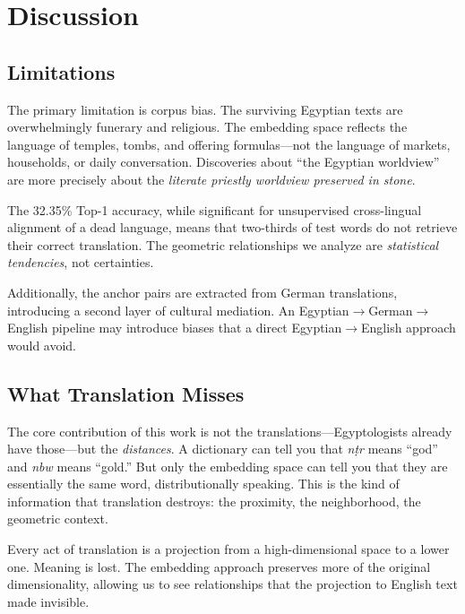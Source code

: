 \documentclass[11pt, a4paper]{article}
\begin{document}
\section{Discussion}
\label{sec:discussion}

\subsection{Limitations}

The primary limitation is corpus bias. The surviving Egyptian texts are overwhelmingly funerary and religious. The embedding space reflects the language of temples, tombs, and offering formulas---not the language of markets, households, or daily conversation. Discoveries about ``the Egyptian worldview'' are more precisely about the \textit{literate priestly worldview preserved in stone}.

The 32.35\% Top-1 accuracy, while significant for unsupervised cross-lingual alignment of a dead language, means that two-thirds of test words do not retrieve their correct translation. The geometric relationships we analyze are \textit{statistical tendencies}, not certainties.

Additionally, the anchor pairs are extracted from German translations, introducing a second layer of cultural mediation. An Egyptian$\to$German$\to$English pipeline may introduce biases that a direct Egyptian$\to$English approach would avoid.

\subsection{What Translation Misses}

The core contribution of this work is not the translations---Egyptologists already have those---but the \textit{distances}. A dictionary can tell you that \textit{n\d{t}r} means ``god'' and \textit{nbw} means ``gold.'' But only the embedding space can tell you that they are essentially the same word, distributionally speaking. This is the kind of information that translation destroys: the proximity, the neighborhood, the geometric context.

Every act of translation is a projection from a high-dimensional space to a lower one. Meaning is lost. The embedding approach preserves more of the original dimensionality, allowing us to see relationships that the projection to English text made invisible.
\end{document}

